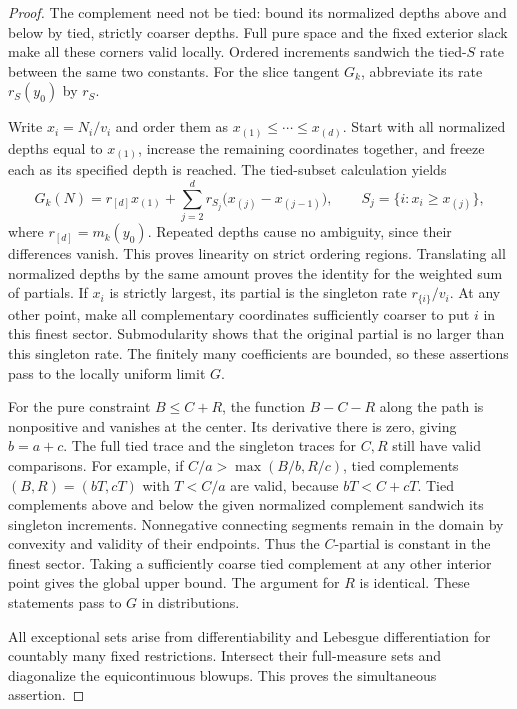 \begin{proof}
The complement need not be tied: bound its normalized depths
above and below by tied, strictly coarser depths.  Full pure
space and the fixed exterior slack make all these corners
valid locally.  Ordered increments sandwich the tied-$S$
rate between the same two constants.  For the slice tangent
$G_k$, abbreviate its rate $r_S(y_0)$ by $r_S$.

Write $x_i=N_i/v_i$ and order them as
$x_{(1)}\leq\cdots\leq x_{(d)}$.  Start with all normalized
depths equal to $x_{(1)}$, increase the remaining coordinates
together, and freeze each as its specified depth is reached.
The tied-subset calculation yields
\[
G_k(N)=r_{[d]}x_{(1)}+
\sum_{j=2}^{d}r_{S_j}\bigl(x_{(j)}-x_{(j-1)}\bigr),
\qquad S_j=\{i:x_i\geq x_{(j)}\},
\]
where $r_{[d]}=m_k(y_0)$.  Repeated depths cause no ambiguity,
since their differences vanish.  This proves linearity on
strict ordering regions.  Translating all normalized depths
by the same amount proves the identity for the weighted sum
of partials.  If $x_i$ is strictly largest, its partial is the
singleton rate $r_{\{i\}}/v_i$.  At any other point, make all
complementary coordinates sufficiently coarser to put $i$ in
this finest sector.  Submodularity shows that the original
partial is no larger than this singleton rate.  The finitely
many coefficients are bounded, so these assertions pass to
the locally uniform limit $G$.

For the pure constraint $B\leq C+R$, the function $B-C-R$ along
the path is nonpositive and vanishes at the center. Its derivative
there is zero, giving $b=a+c$. The full tied trace and
the singleton traces for $C,R$ still have valid comparisons.
For example, if
$C/a>\max(B/b,R/c)$, tied complements
$(B,R)=(bT,cT)$ with $T<C/a$ are valid, because
$bT<C+cT$.  Tied complements above and below the given
normalized complement sandwich its singleton increments.
Nonnegative connecting segments remain in the domain by
convexity and validity of their endpoints.  Thus the
$C$-partial is constant in the finest sector.  Taking a
sufficiently coarse tied complement at any other interior
point gives the global upper bound.  The argument for $R$
is identical.  These statements pass to $G$ in distributions.

All exceptional sets arise from differentiability and Lebesgue
differentiation for countably many fixed restrictions.
Intersect their full-measure sets and diagonalize the
equicontinuous blowups.  This proves the simultaneous assertion.
\end{proof}

